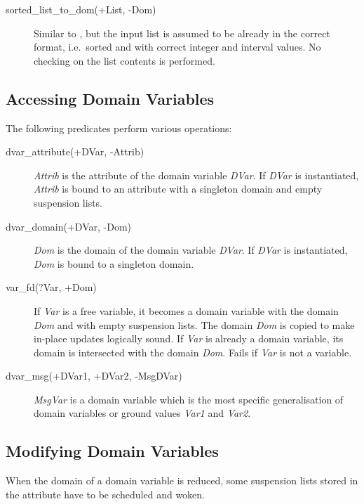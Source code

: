 \begin{description}
\item[sorted_list_to_dom(+List, -Dom)]
Similar to ,  but the input list is assumed
to be already in the correct format, i.e.\ sorted and with correct integer
and interval values.
No checking on the list contents is performed.

\end{description}

\subsection{Accessing Domain Variables}
The following predicates perform various operations:

\begin{description}
\item[dvar_attribute(+DVar, -Attrib)]
{\it Attrib} is the attribute of the domain variable {\it DVar}.
If {\it DVar} is instantiated, {\it Attrib} is bound to an attribute
with a singleton domain and empty suspension lists.

\item[dvar_domain(+DVar, -Dom)]
{\it Dom} is the domain of the domain variable {\it DVar}.
If {\it DVar} is instantiated, {\it Dom} is bound to
a singleton domain.

\item[var_fd(?Var, +Dom)]
If {\it Var} is a free variable,
it becomes a domain variable with the domain {\it Dom}
and with empty suspension lists.
The domain {\it Dom} is copied to make in-place updates
logically sound.
If {\it Var} is already a domain variable, its domain is intersected
with the domain {\it Dom}.
Fails if {\it Var} is not a variable.

\item[dvar_msg(+DVar1, +DVar2, -MsgDVar)]
{\it MsgVar} is a domain variable which is the most specific generalisation
of domain variables or ground values {\it Var1} and {\it Var2}.

\end{description}

\subsection{Modifying Domain Variables}
When the domain of a domain variable is reduced, some suspension
lists stored in the attribute have to be scheduled and woken.

